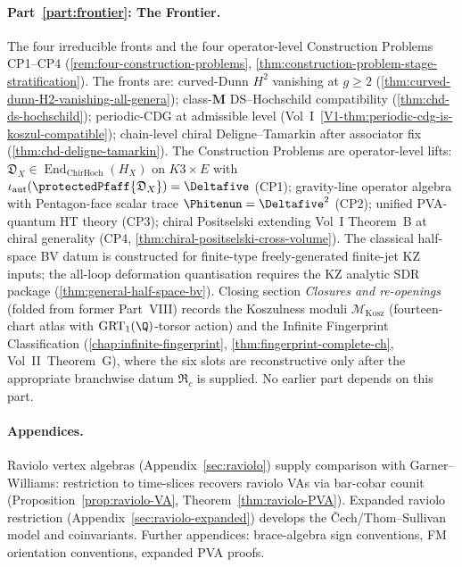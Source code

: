 \paragraph{Part~\ref{part:frontier}: The Frontier.}
The four irreducible fronts and the four operator-level
Construction Problems CP1--CP4
(\cref{rem:four-construction-problems},
\cref{thm:construction-problem-stage-stratification}). The
fronts are: curved-Dunn $H^2$ vanishing at $g \ge 2$
\textup(\cref{thm:curved-dunn-H2-vanishing-all-genera}\textup);
class-$\mathbf{M}$ DS--Hochschild compatibility
\textup(\cref{thm:chd-ds-hochschild}\textup); periodic-CDG at
admissible level
\textup(Vol~I~\cref{V1-thm:periodic-cdg-is-koszul-compatible}\textup);
chain-level chiral Deligne--Tamarkin after associator fix
\textup(\cref{thm:chd-deligne-tamarkin}\textup). The Construction
Problems are operator-level lifts: $\mathfrak D_X\in
\operatorname{End}_{\mathrm{ChirHoch}}(H_X)$ on $K3 \times E$ with
$\iota_{\mathrm{aut}}(\protectedPfaff{\mathfrak D_X})=\Deltafive$
\textup(CP1\textup);
gravity-line operator algebra with Pentagon-face scalar trace
$\Phitenun = \Deltafive^2$ \textup(CP2\textup); unified
PVA-quantum HT theory \textup(CP3\textup); chiral Positselski
extending Vol~I Theorem~B at chiral generality
\textup(CP4,
\cref{thm:chiral-positselski-cross-volume}\textup). The
classical half-space BV datum is constructed for finite-type
freely-generated finite-jet KZ inputs; the all-loop deformation
quantisation requires the KZ analytic SDR package
\textup(\cref{thm:general-half-space-bv}\textup). Closing section
\emph{Closures and re-openings} \textup(folded from former
Part~VIII\textup) records the Koszulness moduli
$\mathcal{M}_{\mathrm{Kosz}}$ \textup(fourteen-chart atlas with
$\mathrm{GRT}_1(\Q)$-torsor action\textup) and the Infinite
Fingerprint Classification
\textup(\cref{chap:infinite-fingerprint},
\cref{thm:fingerprint-complete-ch}, Vol~II~Theorem~G\textup), where
the six slots are reconstructive only after the appropriate
branchwise datum \(\mathfrak R_c\) is supplied.
No earlier part depends on this part.

\paragraph{Appendices.}
Raviolo vertex algebras (Appendix~\ref{sec:raviolo}) supply
comparison with Garner--Williams: restriction to time-slices
recovers raviolo VAs via bar-cobar counit
(Proposition~\ref{prop:raviolo-VA},
Theorem~\ref{thm:raviolo-PVA}). Expanded raviolo restriction
(Appendix~\ref{sec:raviolo-expanded}) develops the
\v{C}ech/Thom--Sullivan model and coinvariants. Further
appendices: brace-algebra sign conventions, FM orientation
conventions, expanded PVA proofs.

